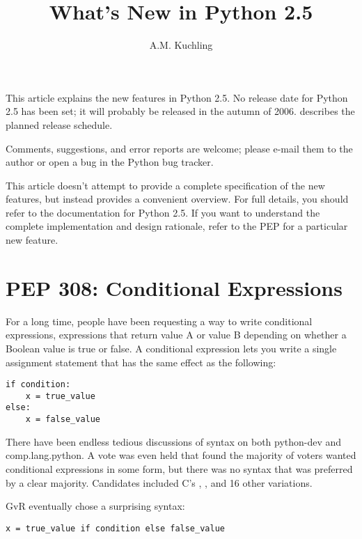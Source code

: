 \documentclass{howto}
\title{What's New in Python 2.5}
\author{A.M. Kuchling}
\begin{document}
\maketitle
\tableofcontents

This article explains the new features in Python 2.5.  No release date
for Python 2.5 has been set; it will probably be released in the
autumn of 2006.   describes the planned release schedule.

Comments, suggestions, and error reports are welcome; please e-mail them 
to the author or open a bug in the Python bug tracker.


This article doesn't attempt to provide a complete specification of
the new features, but instead provides a convenient overview.  For
full details, you should refer to the documentation for Python 2.5.
If you want to understand the complete implementation and design
rationale, refer to the PEP for a particular new feature.


\section{PEP 308: Conditional Expressions\label{pep-308}}

For a long time, people have been requesting a way to write
conditional expressions, expressions that return value A or value B
depending on whether a Boolean value is true or false.  A conditional
expression lets you write a single assignment statement that has the
same effect as the following:

\begin{verbatim}
if condition:
    x = true_value
else:
    x = false_value
\end{verbatim}

There have been endless tedious discussions of syntax on both
python-dev and comp.lang.python.  A vote was even held that found the
majority of voters wanted conditional expressions in some form,
but there was no syntax that was preferred by a clear majority.
Candidates included C's ,
, and 16 other variations.

GvR eventually chose a surprising syntax:

\begin{verbatim}
x = true_value if condition else false_value
\end{verbatim}
\end{document}

